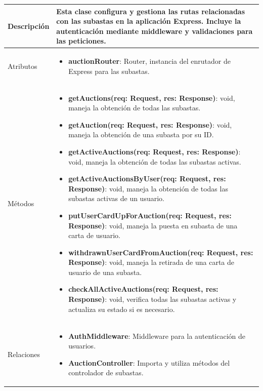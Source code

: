 \begin{longtable}{
    >{\columncolor{lightgreen!20}}p{4cm}
    p{12cm}
    }
    \midrule
    Descripción & Esta clase configura y gestiona las rutas relacionadas con las subastas en la aplicación Express. Incluye la autenticación mediante middleware y validaciones para las peticiones. \\
    \midrule
    Atributos & \begin{itemize}[nosep,leftmargin=*]
      \item \textbf{auctionRouter}: Router, instancia del enrutador de Express para las subastas.
    \end{itemize} \\
    \midrule
    Métodos & \begin{itemize}[nosep,leftmargin=*]
      \item \textbf{getAuctions(req: Request, res: Response)}: void, maneja la obtención de todas las subastas.
      \item \textbf{getAuction(req: Request, res: Response)}: void, maneja la obtención de una subasta por su ID.
      \item \textbf{getActiveAuctions(req: Request, res: Response)}: void, maneja la obtención de todas las subastas activas.
      \item \textbf{getActiveAuctionsByUser(req: Request, res: Response)}: void, maneja la obtención de todas las subastas activas de un usuario.
      \item \textbf{putUserCardUpForAuction(req: Request, res: Response)}: void, maneja la puesta en subasta de una carta de usuario.
      \item \textbf{withdrawnUserCardFromAuction(req: Request, res: Response)}: void, maneja la retirada de una carta de usuario de una subasta.
      \item \textbf{checkAllActiveAuctions(req: Request, res: Response)}: void, verifica todas las subastas activas y actualiza su estado si es necesario.
    \end{itemize} \\
    \midrule
    Relaciones & \begin{itemize}[nosep,leftmargin=*]
      \item \textbf{AuthMiddleware}: Middleware para la autenticación de usuarios.
      \item \textbf{AuctionController}: Importa y utiliza métodos del controlador de subastas.
    \end{itemize} \\
    \end{longtable}


